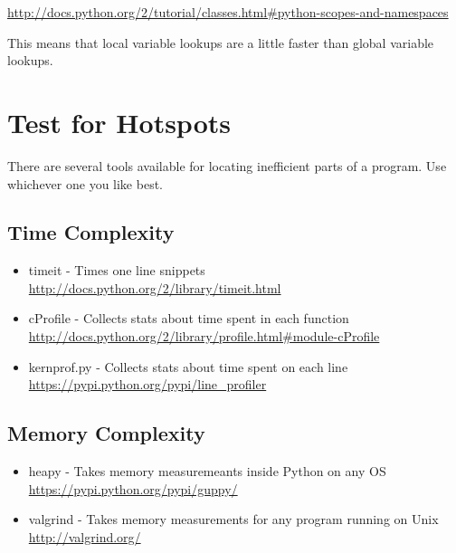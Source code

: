 \documentclass{article}
\begin{document}
\bigskip\noindent
\url{http://docs.python.org/2/tutorial/classes.html#python-scopes-and-namespaces}
\bigskip

\noindent This means that local variable lookups are a little faster
than global variable lookups.

\bigskip

\bigskip
\section{Test for Hotspots}
There are several tools available for locating inefficient parts of a
program.  Use whichever one you like best.
\subsection{Time Complexity}
\begin{itemize}
  \item timeit - Times one line snippets
    \\\url{http://docs.python.org/2/library/timeit.html}
  \item cProfile - Collects stats about time spent in each function
    \\\url{http://docs.python.org/2/library/profile.html#module-cProfile}
  \item kernprof.py - Collects stats about time spent on each line
    \\\url{https://pypi.python.org/pypi/line_profiler}
\end{itemize}
\subsection{Memory Complexity}
\begin{itemize}
  \item heapy - Takes memory measuremeants inside Python on any OS
    \\\url{https://pypi.python.org/pypi/guppy/}
  \item valgrind - Takes memory measurements for any program running on Unix
    \\\url{http://valgrind.org/}
\end{itemize}
\end{document}
